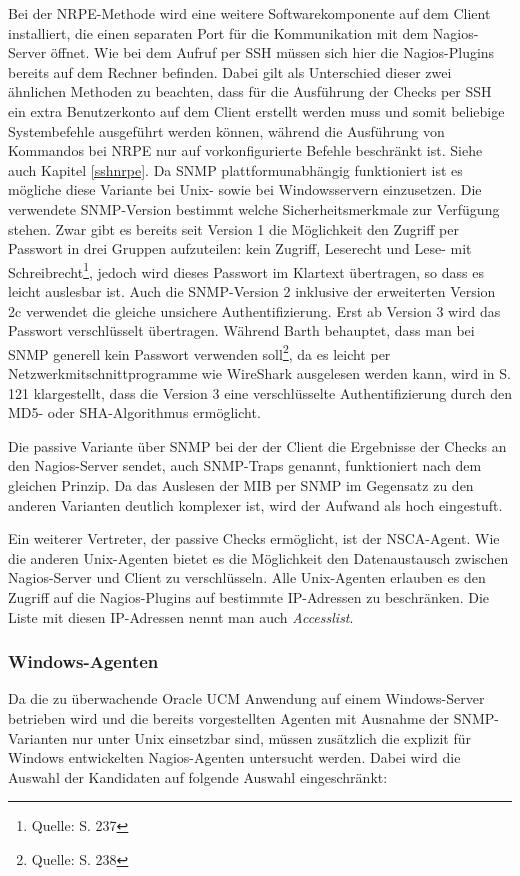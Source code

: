 Bei der \gls{NRPE}-Methode wird eine weitere Softwarekomponente auf dem Client installiert, die einen separaten Port für die Kommunikation mit dem Nagios-Server öffnet.
Wie bei dem Aufruf per \gls{SSH} müssen sich hier die Nagios-Plugins bereits auf dem Rechner befinden.
Dabei gilt als Unterschied dieser zwei ähnlichen Methoden zu beachten, dass für die Ausführung der Checks per \gls{SSH} ein extra Benutzerkonto auf dem Client erstellt werden muss und somit beliebige Systembefehle ausgeführt werden können, während die Ausführung von Kommandos bei \gls{NRPE} nur auf vorkonfigurierte Befehle beschränkt ist.
Siehe auch Kapitel \ref{sshnrpe}.
\label{unixagents}
Da \gls{SNMP} plattformunabhängig funktioniert ist es mögliche diese Variante bei Unix- sowie bei Windowsservern einzusetzen.
Die verwendete \gls{SNMP}-Version bestimmt welche Sicherheitsmerkmale zur Verfügung stehen.
Zwar gibt es bereits seit Version 1 die Möglichkeit den Zugriff per Passwort in drei Gruppen aufzuteilen: kein Zugriff, Leserecht und Lese- mit Schreibrecht\footnote{Quelle: \cite{Barth08} S. 237}, jedoch wird dieses Passwort im Klartext übertragen, so dass es leicht auslesbar ist.
Auch die \gls{SNMP}-Version 2 inklusive der erweiterten Version 2c verwendet die gleiche unsichere Authentifizierung.
Erst ab Version 3 wird das Passwort verschlüsselt übertragen.
Während Barth behauptet, dass man bei \gls{SNMP} generell kein Passwort verwenden soll\footnote{Quelle: \cite{Barth08} S. 238}, da es leicht per Netzwerkmitschnittprogramme wie WireShark ausgelesen werden kann, wird in \cite{Jose07} S. 121 klargestellt, dass die Version 3 eine verschlüsselte Authentifizierung durch den MD5- oder SHA-Algorithmus ermöglicht.

Die passive Variante über \gls{SNMP} bei der der Client die Ergebnisse der Checks an den Nagios-Server sendet, auch \gls{SNMP}-Traps genannt, funktioniert nach dem gleichen Prinzip.
Da das Auslesen der \gls{MIB} per \gls{SNMP} im Gegensatz zu den anderen Varianten deutlich komplexer ist, wird der Aufwand als hoch eingestuft.

Ein weiterer Vertreter, der passive Checks ermöglicht, ist der \gls{NSCA}-Agent.
Wie die anderen Unix-Agenten bietet es die Möglichkeit den Datenaustausch zwischen Nagios-Server und Client zu verschlüsseln.
Alle Unix-Agenten erlauben es den Zugriff auf die Nagios-Plugins auf bestimmte \gls{IP}-Adressen zu beschränken.
Die Liste mit diesen \gls{IP}-Adressen nennt man auch \textit{Accesslist}.

\subsubsection{Windows-Agenten}
Da die zu überwachende Oracle UCM Anwendung auf einem Windows-Server betrieben wird und die bereits vorgestellten Agenten mit Ausnahme der \gls{SNMP}-Varianten nur unter Unix einsetzbar sind, müssen zusätzlich die explizit für Windows entwickelten Nagios-Agenten untersucht werden.
Dabei wird die Auswahl der Kandidaten auf folgende Auswahl eingeschränkt:


